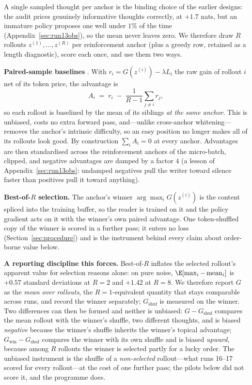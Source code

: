 \documentclass{article} %
\newcommand{\thought}{z}
\newcommand{\gain}{G}
\begin{document}
A single sampled thought per anchor is the binding choice of the earlier designs: the audit prices genuinely informative thoughts correctly, at $+1.7$ nats, but an immature policy proposes one well under $1\%$ of the time (Appendix~\ref{sec:run13obs}), so the mean never leaves zero. We therefore draw $R$ rollouts $\thought^{(1)},\dots,\thought^{(R)}$ per reinforcement anchor (plus a greedy row, retained as a length diagnostic), score each once, and use them two ways.

\textbf{Paired-sample baselines} \citep{kool2019buy}. With $r_i = \gain(\thought^{(i)}) - \lambda L_i$ the raw gain of rollout $i$ net of its token price, the advantage is
\begin{equation}
A_i \;=\; r_i \;-\; \frac{1}{R-1}\sum_{j \neq i} r_j ,
\label{eq:paired}
\end{equation}
so each rollout is baselined by the mean of its siblings \emph{at the same anchor}. This is unbiased, costs no extra forward pass, and---unlike cross-anchor whitening---removes the anchor's intrinsic difficulty, so an easy position no longer makes all of its rollouts look good. By construction $\sum_i A_i = 0$ at every anchor. Advantages are then standardised across the reinforcement anchors of the micro-batch, clipped, and negative advantages are damped by a factor $4$ (a lesson of Appendix~\ref{sec:run13obs}: undamped negatives pull the writer toward silence faster than positives pull it toward anything).

\textbf{Best-of-$R$ selection.} The anchor's winner $\arg\max_i \gain(\thought^{(i)})$ is the content spliced into the training buffer, so the reader is trained on it and the policy gradient acts on it with the winner's own paired advantage. One token-shuffled copy of the winner is scored in a further pass; it enters no loss (Section~\ref{sec:procedure}) and is the instrument behind every claim about order-borne value below.

\textbf{A reporting discipline this forces.} Best-of-$R$ inflates the selected rollout's apparent value for selection reasons alone: on pure noise, $\E[\max_i - \operatorname{mean}_i]$ is $+0.57$ standard deviations at $R{=}2$ and $+1.42$ at $R{=}8$. We therefore report $\gain$ as the \emph{mean over rollouts}, the $R{=}1$-equivalent quantity that stays comparable across runs, and record the winner separately; $\gain_{\mathrm{shuf}}$ is measured on the winner. Two differences can then be formed and neither is unbiased: $\gain - \gain_{\mathrm{shuf}}$ compares the mean rollout with the winner's shuffle, two different thoughts, and is biased \emph{negative} because the winner's shuffle inherits the winner's topical advantage; $\gain_{\mathrm{win}} - \gain_{\mathrm{shuf}}$ compares the winner with its own shuffle and is biased \emph{upward}, because among $R$ rollouts the winner is selected partly for a lucky order. The unbiased instrument is the shuffle of a \emph{non-selected} rollout---what runs 16--17 scored for every rollout---at the cost of one further pass; the pilots below did not score it, and the programme does.
\end{document}
